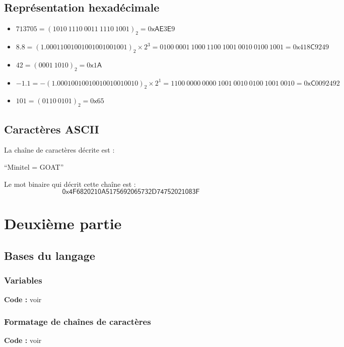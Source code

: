 \documentclass[../main.tex]{subfiles}
\begin{document}
\subsection{Représentation hexadécimale}
\begin{itemize}
	\item $713705 = (1010\ 1110\ 0011\ 1110\ 1001)_{2} = 0\textsf{xAE}3\textsf{E}9$
	\item $8.8 = (1.00011001001001001001001)_{2}\times 2^{3} = 0100\ 0001\ 1000\ 1100\ 1001\ 0010\ 0100\ 1001 = 0\textsf{x}418\textsf{C}9249$
	\item $42 = (0001\ 1010)_{2} = 0\textsf{x}1\textsf{A}$
	\item $-1.1 = -(1.00010010010010010010010)_2\times{2^1} = 1100\ 0000\ 0000\ 1001\ 0010\ 0100\ 1001\ 0010 = 0\textsf{xC}0092492$
	\item $101 = (0110\ 0101)_2 = 0\textsf{x}65$
\end{itemize}
\subsection{Caractères ASCII}
 La chaîne de caractères décrite est : 
\begin{center}
``Minitel = GOAT''
\end{center}
 Le mot binaire qui décrit cette chaîne est :
$$\textsf{0x4F6820210A5175692065732D74752021083F}$$
\section{Deuxième partie}
\subsection{Bases du langage}
\subsubsection{Variables}

\textbf{Code :} voir 
\subsubsection{Formatage de chaînes de caractères}

\textbf{Code :} voir 
\end{document}
